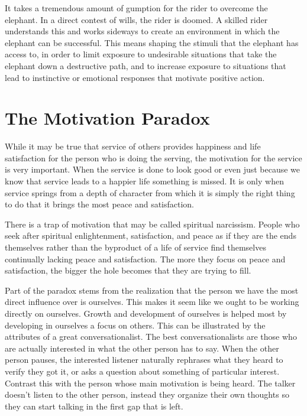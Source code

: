\documentclass[ebook,12pt,openany,twoside]{memoir}
\begin{document}
It takes a tremendous amount of gumption for the rider to overcome the
elephant. In a direct contest of wills, the rider is doomed. A skilled rider
understands this and works sideways to create an environment in which the
elephant can be successful. This means shaping the stimuli that the elephant
has access to, in order to limit exposure to undesirable situations that take
the elephant down a destructive path, and to increase exposure to situations
that lead to instinctive or emotional responses that motivate positive action.

\chapter{The Motivation Paradox}

While it may be true that service of others provides happiness and life
satisfaction for the person who is doing the serving, the motivation for the
service is very important. When the service is done to look good or even just
because we know that service leads to a happier life something is missed. It is
only when service springs from a depth of character from which it is simply the
right thing to do that it brings the most peace and satisfaction.

There is a trap of motivation that may be called spiritual narcissism. People
who seek after spiritual enlightenment, satisfaction, and peace as if they are
the ends themselves rather than the byproduct of a life of service find
themselves continually lacking peace and satisfaction. The more they focus on
peace and satisfaction, the bigger the hole becomes that they are trying to
fill.

Part of the paradox stems from the realization that the person we have the most
direct influence over is ourselves. This makes it seem like we ought to be
working directly on ourselves. Growth and development of ourselves is helped
most by developing in ourselves a focus on others. This can be illustrated by
the attributes of a great conversationalist. The best conversationalists are
those who are actually interested in what the other person has to say. When the
other person pauses, the interested listener naturally rephrases what they
heard to verify they got it, or asks a question about something of particular
interest. Contrast this with the person whose main motivation is being heard.
The talker doesn't listen to the other person, instead they organize their own
thoughts so they can start talking in the first gap that is left.
\end{document}
